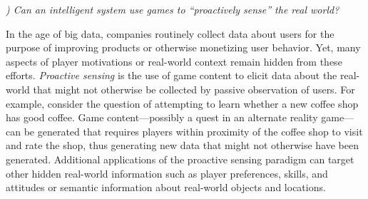 \documentclass[conference]{IEEEtran}
\newcounter{questionno}
\newcommand{\mytodo}[1]{\textbf{[[#1]]}}
\newcommand{\subsubsectionx}[1]{{\em {\arabic{questionno}) #1}}
	\addtocounter{questionno}{1}
	}
\begin{document}


\subsubsectionx{Can an intelligent system use games to ``proactively sense'' the real world?}
%
In the age of big data, companies routinely collect data about users for the purpose of improving products or otherwise monetizing user behavior.
Yet, many aspects of player motivations or real-world context remain hidden from these efforts.
{\em Proactive sensing} is the use of game content to elicit data about the real-world that might not otherwise be collected by passive observation of users.
%
For example, consider the question of attempting to learn whether a new coffee shop has good coffee.
Game content---possibly a quest in an alternate reality game---can be generated that requires players within proximity of the coffee shop to visit and rate the shop, thus generating new data that might not otherwise have been generated.
Additional applications of the proactive sensing paradigm can target other hidden real-world information such as player preferences, skills, and attitudes or semantic information about real-world objects and locations.
\end{document}
